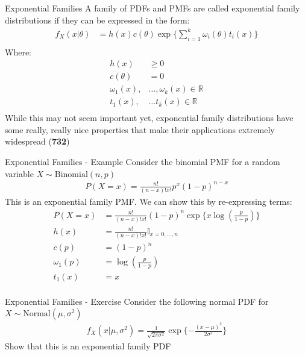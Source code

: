 \documentclass{beamer}
\begin{document}
\begin{frame}{Exponential Families}
A family of PDFs and PMFs are called exponential family distributions if they can be expressed in the form:
\begin{align*}
f_{X}(x|\theta) &= h(x) c(\theta)\exp\{\sum_{i = 1}^{k}\omega_{i}(\theta)t_{i}(x)\}\\
\end{align*}
Where:
\begin{align*}
h(x) &\geq 0 \\
c(\theta) &= 0 \\
\omega_{1}(x),&\ldots,\omega_{k}(x) \in \mathbb{R}\\
t_{1}(x),&\ldots t_{k}(x) \in \mathbb{R}\\
\end{align*}
While this may not seem important yet, exponential family distributions have some really, really nice properties that make their applications extremely widespread (\textbf{732})

\end{frame}

\begin{frame}{Exponential Families - Example}
Consider the binomial PMF for a random variable $X\sim\mathrm{Binomial}(n, p)$
\begin{align*}
P(X = x) = \frac{n!}{(n - x)!x!} p^{x} (1-p)^{n-x}
\end{align*}
This is an exponential family PMF. We can show this by re-expressing terms:
\begin{align*}
P(X = x) &= \frac{n!}{(n - x)!x!} (1-p)^{n} \exp\{x\log(\frac{p}{1-p}) \} \\
h(x) &= \frac{n!}{(n - x)!x!} \mathbb{I}_{x = 0, \ldots, n}\\
c(p) &= (1-p)^{n} \\
\omega_{1}(p) &= \log(\frac{p}{1-p}) \\
t_{1}(x) &= x \\
\end{align*}
\end{frame}

\begin{frame}{Exponential Families - Exercise}
Consider the following normal PDF for $X\sim\mathrm{Normal}(\mu, \sigma^{2})$
\begin{align*}
f_{X}(x|\mu, \sigma^{2}) = \frac{1}{\sqrt{2\pi\sigma^{2}}}\exp\{-\frac{(x-\mu)^{2}}{2\sigma^{2}}\} 
\end{align*}
Show that this is an exponential family PDF
\end{frame}
\end{document}

